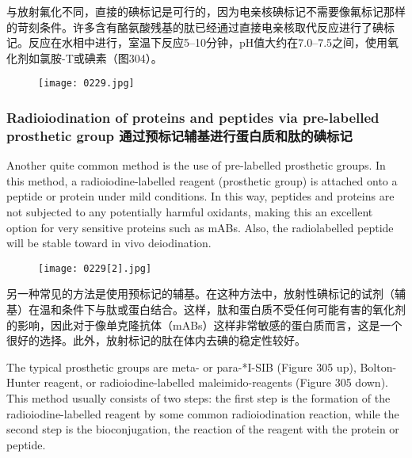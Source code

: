 \documentclass[dvipsnames, svgnames,a4paper,11pt]{article}
\begin{document}
与放射氟化不同，直接的碘标记是可行的，因为电亲核碘标记不需要像氟标记那样的苛刻条件。许多含有酪氨酸残基的肽已经通过直接电亲核取代反应进行了碘标记。反应在水相中进行，室温下反应5–10分钟，pH值大约在7.0–7.5之间，使用氧化剂如氯胺-T或碘素（图304）。  

\begin{figure}[h]
	\centering
    \texttt{[image: 0229.jpg]}  
     \label{fig304}
\end{figure}


\subsubsection{Radioiodination of proteins and peptides via pre-labelled prosthetic group 通过预标记辅基进行蛋白质和肽的碘标记}  
Another quite common method is the use of pre-labelled prosthetic groups. In this method, a radioiodine-labelled reagent (prosthetic group) is attached onto a peptide or protein under mild conditions. In this way, peptides and proteins are not subjected to any potentially harmful oxidants, making this an excellent option for very sensitive proteins such as mABs. Also, the radiolabelled peptide will be stable toward in vivo deiodination.  

\begin{figure}[h]
	\centering
    \texttt{[image: 0229[2].jpg]}  
     \label{fig305}
\end{figure}

另一种常见的方法是使用预标记的辅基。在这种方法中，放射性碘标记的试剂（辅基）在温和条件下与肽或蛋白结合。这样，肽和蛋白质不受任何可能有害的氧化剂的影响，因此对于像单克隆抗体（mABs）这样非常敏感的蛋白质而言，这是一个很好的选择。此外，放射标记的肽在体内去碘的稳定性较好。  

The typical prosthetic groups are meta- or para-*I-SIB (Figure 305 up), Bolton-Hunter reagent, or radioiodine-labelled maleimido-reagents (Figure 305 down). This method usually consists of two steps: the first step is the formation of the radioiodine-labelled reagent by some common radioiodination reaction, while the second step is the bioconjugation, the reaction of the reagent with the protein or peptide.  
\end{document}
